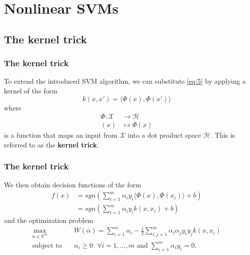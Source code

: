 \documentclass{beamer}
\begin{document}
\section{Nonlinear SVMs}

\subsection{The kernel trick}

\begin{frame}{}
	\frametitle{The kernel trick}
	To extend the introduced SVM algorithm, we can substitute \eqref{eq:5} by applying a kernel of the form
    \begin{equation}
        k(x,x') = \langle \Phi (x), \Phi (x') \rangle
    \end{equation}
    where 
    \begin{equation}
        \begin{aligned}
            \Phi: \mathcal{X} & \rightarrow \mathcal{H} \\
            (x) & \mapsto \Phi (x)
        \end{aligned}
    \end{equation}
    is a function that maps an input from $ \mathcal{X} $ into a dot product space $ \mathcal{H} $. This is referred to as the \textbf{kernel trick}.
\end{frame}


\begin{frame}{}
	\frametitle{The kernel trick}
	We then obtain decision functions of the form
    \begin{align}
        f(x) & = sgn \left( \sum_{i=1}^{m} \alpha_i y_i \langle \Phi (x), \Phi (x_i) \rangle + b \right) \\ 
        & = sgn \left( \sum_{i=1}^{m} \alpha_i y_i k(x,x_i) + b \right)
    \end{align}
    and the optimization problem
    \begin{equation} \label{eq:6}
        \begin{aligned}
            \max_{\alpha \in \mathbb{R}^m} \quad & W(\alpha) = \sum_{i=1}^{m} \alpha_i - \frac{1}{2} \sum_{i,j=1}^{m} \alpha_i \alpha_j y_i y_j k(x, x_i) \\
            \textrm{subject to} \quad & \alpha_i \geq 0 \text{ } \forall i = {1, \dots, m} \text{ and } \sum_{i=1}^{m} \alpha_i y_i = 0. 
        \end{aligned}
    \end{equation}
\end{frame}
\end{document}

